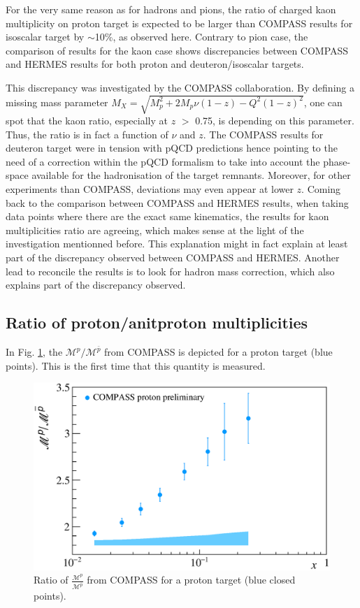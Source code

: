 For the very same reason as for hadrons and pions, the ratio of charged kaon multiplicity on proton target is expected to be larger than COMPASS results for isoscalar target by $\sim$10\%, as observed here. Contrary to pion case, the comparison of results for the kaon case shows discrepancies between COMPASS and HERMES results for both proton and deuteron/isoscalar targets.

This discrepancy was investigated by the COMPASS collaboration\cite{MarcinPubli}. By defining a missing mass parameter $M_X = \sqrt{M^2_p + 2M_p \nu (1-z) - Q^2 (1-z)^2}$, one can spot that the kaon ratio, especially at $z$ $>$ 0.75, is depending on this parameter. Thus, the ratio is in fact a function of $\nu$ and $z$. The COMPASS results for deuteron target were in tension with pQCD predictions hence pointing to the need of a correction within the pQCD formalism to take into account the phase-space available for the hadronisation of the target remnants. Moreover, for other experiments than COMPASS, deviations may even appear at lower $z$. Coming back to the comparison between COMPASS and HERMES results, when taking data points where there are the exact same kinematics, the results for kaon multiplicities ratio are agreeing, which makes sense at the light of the investigation mentionned before. This explanation might in fact explain at least part of the discrepancy observed between COMPASS and HERMES. Another lead to reconcile the results is to look for hadron mass correction\cite{Accardi}, which also explains part of the discrepancy observed.

\subsection{Ratio of proton/anitproton multiplicities}

In Fig. \ref{pic:pratio}, the $\mathscr{M}^{p}/\mathscr{M}^{\bar{p}}$ from COMPASS is depicted for a proton target (blue points). This is the first time that this quantity is measured.

\begin{figure}[!h]
  \centering
	\includegraphics[scale=0.5]{./gfx/Mult_p_ratio.eps}
	\caption{Ratio of $\frac{\mathscr{M}^{p}}{\mathscr{M}^{\overline{p}}}$ from COMPASS for a proton target (blue closed points).}
	\label{pic:pratio}
\end{figure}

